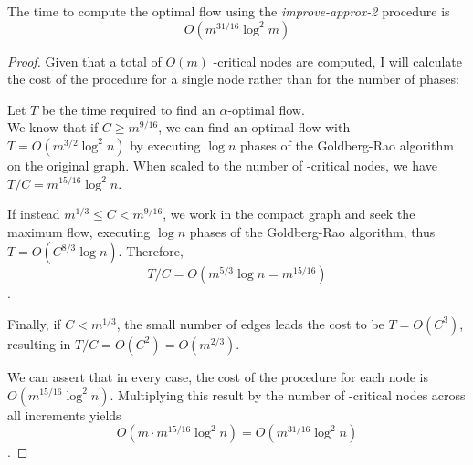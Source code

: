 \begin{lemma}
    The time to compute the optimal flow using the \textit{improve-approx-2} procedure is 
    \[ O(m^{31/16} \log^2 m) \]
\end{lemma}
\begin{proof}
    Given that a total of \( O(m) \) \gmm-critical nodes are computed, I will calculate the cost of the procedure for a single node rather than for the number of phases:
    
    Let \( T \) be the time required to find an \(\alpha\)-optimal flow.\\
    We know that if \( C \ge m^{9/16} \), we can find an optimal flow with \( T = O(m^{3/2} \log^2 n) \) by executing \( \log n \) phases of the Goldberg-Rao algorithm on the original graph. When scaled to the number of \gmm-critical nodes, we have \( T/C = m^{15/16} \log^2 n \).
    
    If instead \( m^{1/3} \le C < m^{9/16} \), we work in the compact graph and seek the maximum flow, executing \( \log n \) phases of the Goldberg-Rao algorithm, thus \( T = O(C^{8/3} \log n) \). Therefore, 
    \[ T/C = O(m^{5/3} \log n = m^{15/16}) \].
    
    Finally, if \( C < m^{1/3} \), the small number of edges leads the cost to be \( T = O(C^3) \), resulting in \( T/C = O(C^2) = O(m^{2/3}) \).

    We can assert that in every case, the cost of the procedure for each node is \( O(m^{15/16} \log^2 n) \). Multiplying this result by the number of \gmm-critical nodes across all increments yields 
    \[ O(m \cdot m^{15/16} \log^2 n) = O(m^{31/16} \log^2 n) \]. 
\end{proof}

